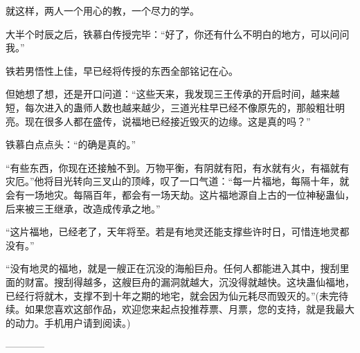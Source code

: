\begin{this_body}
就这样，两人一个用心的教，一个尽力的学。

大半个时辰之后，铁慕白传授完毕：“好了，你还有什么不明白的地方，可以问问我。”

铁若男悟性上佳，早已经将传授的东西全部铭记在心。

但她想了想，还是开口问道：“这些天来，我发现三王传承的开启时间，越来越短，每次进入的蛊师人数也越来越少，三道光柱早已经不像原先的，那般粗壮明亮。现在很多人都在盛传，说福地已经接近毁灭的边缘。这是真的吗？”

铁慕白点点头：“的确是真的。”

“有些东西，你现在还接触不到。万物平衡，有阴就有阳，有水就有火，有福就有灾厄。”他将目光转向三叉山的顶峰，叹了一口气道：“每一片福地，每隔十年，就会有一场地灾。每隔百年，都会有一场天劫。这片福地源自上古的一位神秘蛊仙，后来被三王继承，改造成传承之地。”

“这片福地，已经老了，天年将至。若是有地灵还能支撑些许时日，可惜连地灵都没有。”

“没有地灵的福地，就是一艘正在沉没的海船巨舟。任何人都能进入其中，搜刮里面的财富。搜刮得越多，这艘巨舟的漏洞就越大，沉没得就越快。这块蛊仙福地，已经行将就木，支撑不到十年之期的地宅，就会因为仙元耗尽而毁灭的。”(未完待续。如果您喜欢这部作品，欢迎您来起点投推荐票、月票，您的支持，就是我最大的动力。手机用户请到阅读。)

------------

\end{this_body}

